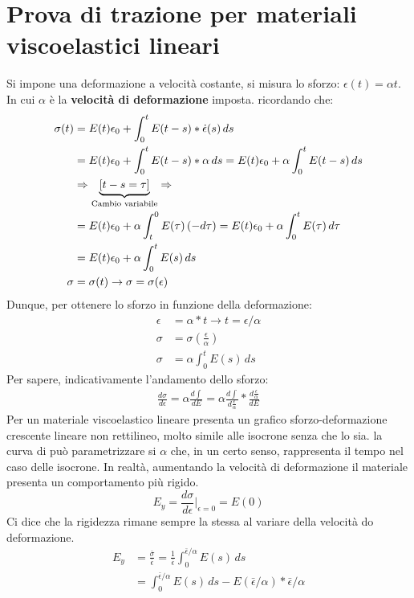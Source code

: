 \section{Prova di trazione per materiali viscoelastici lineari}
Si impone una deformazione a velocità costante, si misura lo sforzo: $\epsilon(t) = \alpha t$.
In cui $\alpha$ è la \textbf{velocità di deformazione} imposta.
ricordando che:
\begin{equation}
\begin{split}
\sigma(t) &= E(t)\epsilon_0 + \int_0^t{E(t-s)*\dot{\epsilon}(s)\,ds}\\
&=E(t)\epsilon_0 + \int_0^t{E(t-s)*\alpha\,ds} =E(t)\epsilon_0 + \alpha \int_0^t{E(t-s)\,ds}\\
&\Rightarrow \underbrace{\left[t-s = \tau\right]}_{\textup{Cambio variabile}} \Rightarrow\\
&=E(t)\epsilon_0 + \alpha \int_t^0{E(\tau)\,(-d\tau)} = E(t)\epsilon_0 + \alpha \int_0^t{E(\tau)\,d\tau}\\
&= E(t)\epsilon_0 + \alpha \int_0^t{E(s)\,ds}\\
\sigma &= \sigma(t) \rightarrow \sigma = \sigma(\epsilon)
\end{split}
\end{equation}
Dunque, per ottenere lo sforzo in funzione della deformazione:
\begin{equation}
\begin{split}
\epsilon &= \alpha * t \rightarrow t = \epsilon/\alpha\\
\sigma &= \sigma\left(\frac{\epsilon}{\alpha}\right)\\
\sigma &= \alpha \int_0^t{E(s)\,ds}
\end{split}
\end{equation}
Per sapere, indicativamente l'andamento dello sforzo:
\begin{equation}
\begin{split}
\frac{d\sigma}{d\epsilon} = \alpha\frac{d\int}{dE} = \alpha \frac{d\int}{d\frac{\epsilon}{\alpha}}*\frac{d\frac{\epsilon}{\alpha}}{dE}
\end{split}
\end{equation}
Per un materiale viscoelastico lineare presenta un grafico sforzo-deformazione crescente lineare non rettilineo, molto simile alle isocrone senza che lo sia.
la curva di può parametrizzare si $\alpha$ che, in un certo senso, rappresenta il tempo nel caso delle isocrone. In realtà, aumentando la velocità di deformazione il materiale presenta un comportamento più rigido.
\begin{equation}
E_y = \frac{d\sigma}{d\epsilon}\Big|_{\epsilon = 0} = E(0)
\end{equation}
Ci dice che la rigidezza rimane sempre la stessa al variare della velocità do deformazione.
\begin{equation}
\begin{split}
E_y &= \frac{\bar{\sigma}}{\bar{\epsilon}} = \frac{1}{\bar{\epsilon}}\int_0^{\bar{\epsilon}/\alpha}{E(s)\,ds}\\
&= \int_0^{\bar{\epsilon}/\alpha}{E(s)\,ds} - E(\bar{\epsilon}/\alpha) * \bar{\epsilon}/\alpha
\end{split}
\end{equation}

